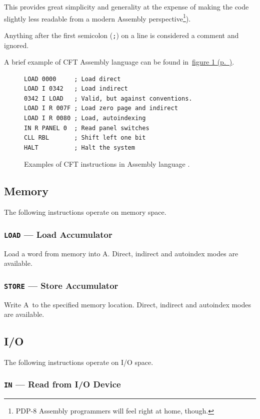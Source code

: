 \documentclass[11pt,a4paper,twocolumns]{article}
\newcommand{\cf}[2][section]{\hyperref[#2]{#1 \ref*{#2} (p.~\pageref*{#2})}}
\newcommand{\fcf}[1]{\cf[figure]{#1}}
\newcommand\register[1]{\textsf{#1}}
\newcommand\A{\register{A}}
\begin{document}
This provides great simplicity and generality at the expense of making
the code slightly less readable from a modern Assembly
perspective\footnote{PDP-8 Assembly programmers will feel right at
  home, though.}).

Anything after the first semicolon ({\tt ;}) on a line is considered a
comment and ignored.

A brief example of CFT Assembly language can be found in~\fcf{fig-asm}.

\begin{figure}
\small
\begin{verbatim}
LOAD 0000     ; Load direct
LOAD I 0342   ; Load indirect
0342 I LOAD   ; Valid, but against conventions.
LOAD I R 007F ; Load zero page and indirect
LOAD I R 0080 ; Load, autoindexing
IN R PANEL 0  ; Read panel switches
CLL RBL       ; Shift left one bit
HALT          ; Halt the system
\end{verbatim}
\caption{\label{fig-asm}Examples of CFT instructions in Assembly language .}
\end{figure}

\subsection{Memory}

The following instructions operate on memory space.

\subsubsection{{\tt LOAD} — Load Accumulator}
\label{sec-load}

Load a word from memory into \A. Direct, indirect and autoindex modes are available.

\subsubsection{{\tt STORE} — Store Accumulator}
\label{sec-store}

Write \A\ to the specified memory location. Direct, indirect and autoindex modes are available.

\subsection{I/O}

The following instructions operate on I/O space.

\subsubsection{{\tt IN} — Read from I/O Device}
\label{sec-in}
\end{document}

